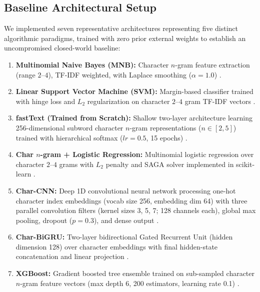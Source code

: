 \documentclass[11pt]{article}
\begin{document}
\subsection{Baseline Architectural Setup}
We implemented seven representative architectures representing five distinct algorithmic paradigms, trained with zero prior external weights to establish an uncompromised closed-world baseline:
\begin{enumerate}
    \item \textbf{Multinomial Naive Bayes (MNB):} Character $n$-gram feature extraction (range $2$--$4$), TF-IDF weighted, with Laplace smoothing ($\alpha=1.0$) \cite{mccallum1998comparison}.
    \item \textbf{Linear Support Vector Machine (SVM):} Margin-based classifier trained with hinge loss and $L_2$ regularization on character $2$--$4$ gram TF-IDF vectors \cite{joachims1998text}.
    \item \textbf{fastText (Trained from Scratch):} Shallow two-layer architecture learning 256-dimensional subword character $n$-gram representations ($n \in [2, 5]$) trained with hierarchical softmax ($lr=0.5$, 15 epochs) \cite{joulin2017bag}.
    \item \textbf{Char $n$-gram + Logistic Regression:} Multinomial logistic regression over character $2$--$4$ grams with $L_2$ penalty and SAGA solver implemented in scikit-learn \cite{pedregosa2011scikit}.
    \item \textbf{Char-CNN:} Deep 1D convolutional neural network processing one-hot character index embeddings (vocab size 256, embedding dim 64) with three parallel convolution filters (kernel sizes 3, 5, 7; 128 channels each), global max pooling, dropout ($p=0.3$), and dense output \cite{zhang2015character}.
    \item \textbf{Char-BiGRU:} Two-layer bidirectional Gated Recurrent Unit (hidden dimension 128) over character embeddings with final hidden-state concatenation and linear projection \cite{cho2014learning}.
    \item \textbf{XGBoost:} Gradient boosted tree ensemble trained on sub-sampled character $n$-gram feature vectors (max depth 6, 200 estimators, learning rate 0.1) \cite{chen2016xgboost}.
\end{enumerate}
\end{document}
